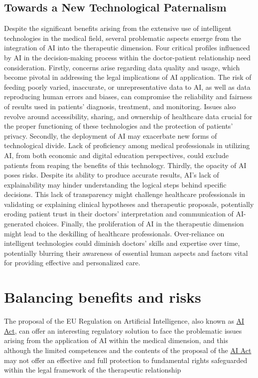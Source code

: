 \subsection{Towards a New Technological Paternalism}
Despite the significant benefits arising from the extensive use of intelligent technologies in the medical field, several problematic aspects emerge from the integration of AI into the therapeutic dimension. Four critical profiles influenced by AI in the decision-making process within the doctor-patient relationship need consideration.
\newline
Firstly, concerns arise regarding data quality and usage, which become pivotal in addressing the legal implications of AI application. The risk of feeding poorly varied, inaccurate, or unrepresentative data to AI, as well as data reproducing human errors and biases, can compromise the reliability and fairness of results used in patients' diagnosis, treatment, and monitoring. Issues also revolve around accessibility, sharing, and ownership of healthcare data crucial for the proper functioning of these technologies and the protection of patients' privacy.
\newline
Secondly, the deployment of AI may exacerbate new forms of technological divide. Lack of proficiency among medical professionals in utilizing AI, from both economic and digital education perspectives, could exclude patients from reaping the benefits of this technology.
\newline
Thirdly, the opacity of AI poses risks. Despite its ability to produce accurate results, AI's lack of explainability may hinder understanding the logical steps behind specific decisions. This lack of transparency might challenge healthcare professionals in validating or explaining clinical hypotheses and therapeutic proposals, potentially eroding patient trust in their doctors' interpretation and communication of AI-generated choices.
\newline
Finally, the proliferation of AI in the therapeutic dimension might lead to the deskilling of healthcare professionals. Over-reliance on intelligent technologies could diminish doctors' skills and expertise over time, potentially blurring their awareness of essential human aspects and factors vital for providing effective and personalized care.

\section{Balancing benefits and risks}
The proposal of the EU Regulation on Artificial Intelligence, also known 
as \hyperref[sec:AIAct]{AI Act}, can offer an interesting regulatory solution to face the problematic issues arising 
from the application of AI within the medical dimension, and this although the limited 
competences and the contents of the proposal of the \hyperref[sec:AIAct]{AI Act} may not offer an effective and full 
protection to fundamental rights safeguarded within the legal framework of the therapeutic 
relationship
